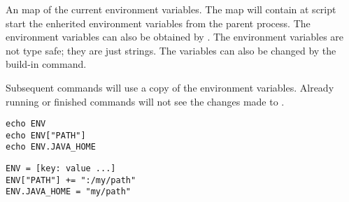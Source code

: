 %

An map of the current environment variables. The map will contain
at script start the enherited environment variables from the parent process.
The environment variables can also be obtained by \cite{getenv13}.
The environment variables are not type safe; they are just strings.
The variables can also be changed by the  build-in command.

Subsequent commands will use a copy of the environment variables. 
Already running or finished commands will not see the changes
made to .

\begin{lstlisting}[style=Groovybash, label={lst:example_args}, title={
Print the current environment variables.}]
echo ENV
echo ENV["PATH"]
echo ENV.JAVA_HOME
\end{lstlisting}

\begin{lstlisting}[style=Groovybash, label={lst:example_args}, title={
Set environment variables to new value.}]
ENV = [key: value ...]
ENV["PATH"] += ":/my/path"
ENV.JAVA_HOME = "my/path"
\end{lstlisting}

